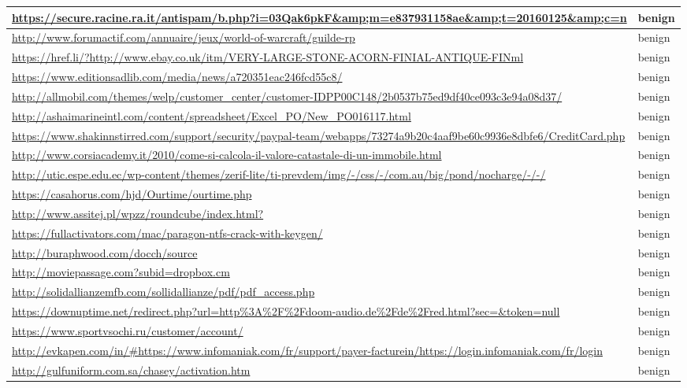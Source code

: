 \documentclass[12pt,twoside]{report}
\begin{document}
\begin{spacing}{1}
\begin{center}
\begin{longtable}{ |>{\raggedright\arraybackslash}p{}|>{\raggedright\arraybackslash}p{}| }
\url{https://secure.racine.ra.it/antispam/b.php?i=03Qak6pkF&amp;m=e837931158ae&amp;t=20160125&amp;c=n} & benign
\\
\hline
\url{http://www.forumactif.com/annuaire/jeux/world-of-warcraft/guilde-rp} & benign
\\
\hline
\url{https://href.li/?http://www.ebay.co.uk/itm/VERY-LARGE-STONE-ACORN-FINIAL-ANTIQUE-FINml} & benign
\\
\hline
\url{https://www.editionsadlib.com/media/news/a720351eac246fcd55c8/} & benign
\\
\hline
\url{http://allmobil.com/themes/welp/customer_center/customer-IDPP00C148/2b0537b75ed9df40ce093c3e94a08d37/} & benign
\\
\hline
\url{http://ashaimarineintl.com/content/spreadsheet/Excel_PO/New_PO016117.html} & benign
\\
\hline
\url{https://www.shakinnstirred.com/support/security/paypal-team/webapps/73274a9b20c4aaf9be60c9936e8dbfe6/CreditCard.php} & benign
\\
\hline
\url{http://www.corsiacademy.it/2010/come-si-calcola-il-valore-catastale-di-un-immobile.html} & benign
\\
\hline
\url{http://utic.espe.edu.ec/wp-content/themes/zerif-lite/ti-prevdem/img/-/css/-/com.au/big/pond/nocharge/-/-/} & benign
\\
\hline
\url{https://casahorus.com/hjd/Ourtime/ourtime.php} & benign
\\
\hline
\url{http://www.assitej.pl/wpzz/roundcube/index.html?} & benign
\\
\hline
\url{https://fullactivators.com/mac/paragon-ntfs-crack-with-keygen/} & benign
\\
\hline
\url{http://buraphwood.com/docch/source} & benign
\\
\hline
\url{http://moviepassage.com?subid=dropbox.cm} & benign
\\
\hline
\url{http://solidallianzemfb.com/sollidallianze/pdf/pdf_access.php} & benign
\\
\hline
\url{https://downuptime.net/redirect.php?url=http\%3A\%2F\%2Fdoom-audio.de\%2Fde\%2Fred.html?sec=&token=null} & benign
\\
\hline
\url{https://www.sportvsochi.ru/customer/account/} & benign
\\
\hline
\url{http://evkapen.com/in/#https://www.infomaniak.com/fr/support/payer-facturein/https://login.infomaniak.com/fr/login} & benign
\\
\hline
\url{http://gulfuniform.com.sa/chasey/activation.htm} & benign
\\

\end{longtable}
\end{center}
\end{spacing}
\end{document}
